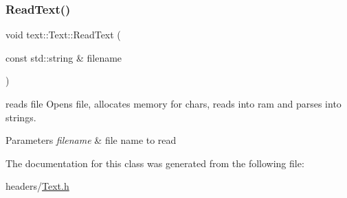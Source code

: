 \subsubsection{\texorpdfstring{Read\+Text()}{ReadText()}}
{\footnotesize\ttfamily void text\+::\+Text\+::\+Read\+Text (\begin{DoxyParamCaption}\item[{const std\+::string \&}]{filename }\end{DoxyParamCaption})}



reads file Opens file, allocates memory for chars, reads into ram and parses into strings. 


\begin{DoxyParams}{Parameters}
{\em filename} & file name to read \\
\hline
\end{DoxyParams}


The documentation for this class was generated from the following file\+:\begin{DoxyCompactItemize}
\item 
headers/\hyperlink{Text_8h}{Text.\+h}\end{DoxyCompactItemize}
